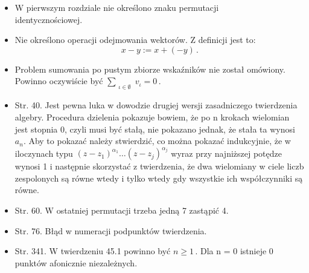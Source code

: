 \documentclass[a4paper,11pt]{article}
\begin{document}
\begin{itemize}
\item W pierwszym rozdziale nie określono znaku permutacji
  \\identycznościowej.

\item Nie określono operacji odejmowania wektorów. Z definicji jest
  to:$$x - y := x + ( -y ) \, .$$

\item Problem sumowania po pustym zbiorze wskaźników nie został
  omówiony. Powinno oczywiście być
  $\sum_{ \substack{ \iota \in \emptyset } } v_{ \iota } = 0 \, .$

\item Str. 40. Jest pewna luka w dowodzie drugiej wersji zasadniczego
  twierdzenia algebry. Procedura dzielenia pokazuje bowiem, że po n
  krokach wielomian jest stopnia 0, czyli musi być stałą, nie pokazano
  jednak, że stała ta wynosi $a_{ n }$. Aby to pokazać należy
  stwierdzić, co można pokazać indukcyjnie, że w iloczynach typu
  $( z - z_{ 1 } )^{ \alpha_{ 1 } } \ldots( z - z_{ j } )^{ \alpha_{ j } }$ wyraz
  przy najniższej potędze wynosi 1 i następnie skorzystać z
  twierdzenia, że dwa wielomiany w ciele liczb zespolonych są równe
  wtedy i tylko wtedy gdy wszystkie ich współczynniki są równe.

\item Str. 60. W ostatniej permutacji trzeba jedną 7 zastąpić 4.

\item Str. 76. Błąd w numeracji podpunktów twierdzenia.

\item Str. 341. W twierdzeniu 45.1 powinno być $n \geq 1 \, .$ Dla n = 0
  istnieje 0 punktów afonicznie niezależnych.

\end{itemize}





\end{document}
